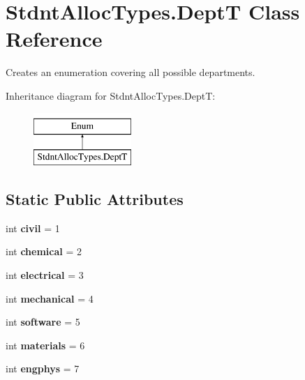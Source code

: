 \hypertarget{class_stdnt_alloc_types_1_1_dept_t}{}\section{Stdnt\+Alloc\+Types.\+DeptT Class Reference}
\label{class_stdnt_alloc_types_1_1_dept_t}


Creates an enumeration covering all possible departments.  


Inheritance diagram for Stdnt\+Alloc\+Types.\+DeptT\+:\begin{figure}[H]
\begin{center}
\leavevmode
\includegraphics[height=2.000000cm]{class_stdnt_alloc_types_1_1_dept_t}
\end{center}
\end{figure}
\subsection*{Static Public Attributes}
\begin{DoxyCompactItemize}
\item 
\mbox{\label{class_stdnt_alloc_types_1_1_dept_t_aada6de6cfa9e35835c94897913588edd}} 
int {\bfseries civil} = 1
\item 
\mbox{\label{class_stdnt_alloc_types_1_1_dept_t_a80264399591475d30e2b11edc8d3ed90}} 
int {\bfseries chemical} = 2
\item 
\mbox{\label{class_stdnt_alloc_types_1_1_dept_t_a05ec081635b490c6c2bd52b1a236d1db}} 
int {\bfseries electrical} = 3
\item 
\mbox{\label{class_stdnt_alloc_types_1_1_dept_t_a1aa44583eb22b8d664787fc5e82c5043}} 
int {\bfseries mechanical} = 4
\item 
\mbox{\label{class_stdnt_alloc_types_1_1_dept_t_a1b548d82705fc0b22d69d3628aaf4e4a}} 
int {\bfseries software} = 5
\item 
\mbox{\label{class_stdnt_alloc_types_1_1_dept_t_a89d19f797874a4f94621203c4a7b66e5}} 
int {\bfseries materials} = 6
\item 
\mbox{\label{class_stdnt_alloc_types_1_1_dept_t_af667a50955375f70988312c529ba7964}} 
int {\bfseries engphys} = 7
\end{DoxyCompactItemize}


